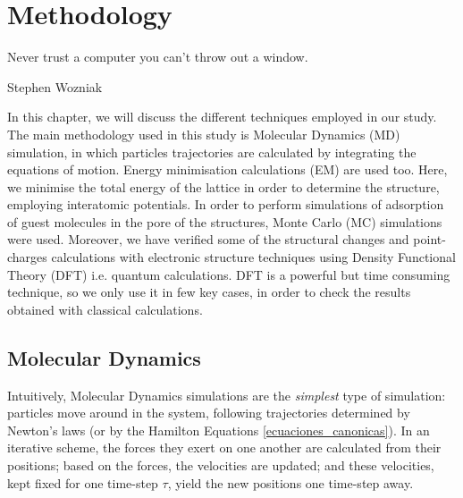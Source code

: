 
\chapter{Methodology}
\label{chp:methos}
\epigraph{Never trust a computer you can't throw out a window.}{Stephen Wozniak}
In this chapter, we will discuss the different techniques employed in our study. The main methodology used in this study is Molecular Dynamics (MD) simulation, in which particles trajectories are calculated by integrating the equations of motion. Energy minimisation calculations (EM) are used too. Here, we minimise the total energy of the lattice in order to determine the structure, employing interatomic potentials. In order to perform simulations of adsorption of guest molecules in the pore of the structures, Monte Carlo (MC) simulations were used. Moreover, we have verified some of the structural changes and point-charges calculations with electronic structure techniques using Density Functional Theory (DFT) i.e. quantum calculations. DFT is a powerful but time consuming technique, so we only use it in few key cases, in order to check the results obtained with classical calculations.

\section{Molecular Dynamics}
Intuitively, Molecular Dynamics simulations are the \textit{simplest} type of simulation: particles move around in the system, following trajectories determined by Newton's laws (or by the Hamilton Equations \ref{ecuaciones_canonicas}). In an iterative scheme, the forces they exert on one another are calculated from their positions; based on the forces, the velocities are updated; and these velocities, kept fixed for one time-step $\tau$, yield the new positions one time-step away.

